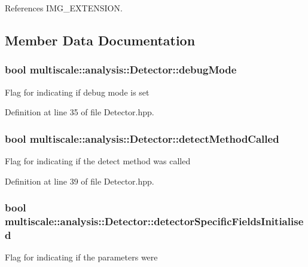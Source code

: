 References I\-M\-G\-\_\-\-E\-X\-T\-E\-N\-S\-I\-O\-N.



\subsection{Member Data Documentation}
\hypertarget{classmultiscale_1_1analysis_1_1Detector_a4b42f796957efd6ee0b8cf7645494a65}{
\subsubsection[{debug\-Mode}]{\setlength{\rightskip}{0pt plus 5cm}bool multiscale\-::analysis\-::\-Detector\-::debug\-Mode\hspace{0.3cm}{\ttfamily [protected]}}}\label{classmultiscale_1_1analysis_1_1Detector_a4b42f796957efd6ee0b8cf7645494a65}
Flag for indicating if debug mode is set 

Definition at line 35 of file Detector.\-hpp.

\hypertarget{classmultiscale_1_1analysis_1_1Detector_ad565f471d9d7db7692da588ff0d6be2f}{
\subsubsection[{detect\-Method\-Called}]{\setlength{\rightskip}{0pt plus 5cm}bool multiscale\-::analysis\-::\-Detector\-::detect\-Method\-Called\hspace{0.3cm}{\ttfamily [protected]}}}\label{classmultiscale_1_1analysis_1_1Detector_ad565f471d9d7db7692da588ff0d6be2f}
Flag for indicating if the detect method was called 

Definition at line 39 of file Detector.\-hpp.

\hypertarget{classmultiscale_1_1analysis_1_1Detector_a172b91067670a14a7707f24dc218f2af}{
\subsubsection[{detector\-Specific\-Fields\-Initialised}]{\setlength{\rightskip}{0pt plus 5cm}bool multiscale\-::analysis\-::\-Detector\-::detector\-Specific\-Fields\-Initialised\hspace{0.3cm}{\ttfamily [protected]}}}\label{classmultiscale_1_1analysis_1_1Detector_a172b91067670a14a7707f24dc218f2af}
Flag for indicating if the parameters were 

